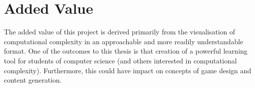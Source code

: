 \documentclass[a4paper]{article}
\begin{document}
\section{Added Value}

The added value of this project is derived primarily from the visualisation of computational complexity in an approachable and more readily understandable format. One of the outcomes to this thesis is that creation of a powerful learning tool for students of computer science (and others interested in computational complexity). Furthermore, this could have impact on concepts of game design and content generation. 
\end{document}
